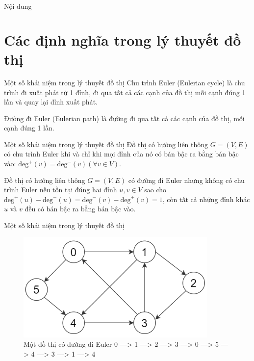 \documentclass[10pt]{beamer}
\theoremstyle{remark}
\numberwithin{algocf}{section}
\numberwithin{equation}{section}
\numberwithin{dl}{section}
\numberwithin{figure}{section}
\begin{document}
\begin{frame}[plain]{Nội dung}
    \tableofcontents[hidesubsections]
\end{frame}

\section{Các định nghĩa trong lý thuyết đồ thị}

\begin{frame}{Một số khái niệm trong lý thuyết đồ thị}
    Chu trình Euler (Eulerian cycle) là chu trình đi xuất phát từ 1 đỉnh, đi qua tất cả các cạnh của đồ thị mỗi cạnh đúng 1 lần và quay lại đỉnh xuất phát.

    Đường đi Euler (Eulerian path) là đường đi qua tất cả các cạnh của đồ thị, mỗi cạnh đúng 1 lần.

\end{frame}
\begin{frame}{Một số khái niệm trong lý thuyết đồ thị}
    Đồ thị có hướng liên thông $G=(V,E)$ có chu trình Euler khi và chỉ khi mọi đỉnh của nó có bán bậc ra bằng bán bậc vào: $\mathrm{deg}^{+}(v)=\mathrm{deg}^{-}(v) (\forall v \in V)$.

    Đồ thị có hướng liên thông $G=(V,E)$ có đường đi Euler nhưng không có chu trình Euler nếu tồn tại đúng hai đỉnh $u, v \in V$ sao cho $\mathrm{deg}^{+}(u) - \mathrm{deg}^{-}(u)=\mathrm{deg}^{-}(v) - \mathrm{deg}^{+}(v)=1$,
    còn tất cả những đỉnh khác $u$ và $v$ đều có bán bậc ra bằng bán bậc vào.
\end{frame}

\begin{frame}{Một số khái niệm trong lý thuyết đồ thị}
    \begin{figure}[h!]
        \centering
        \includegraphics[height=0.6\textheight]{figures/eulerian_path_example.png}
        \caption{Một đồ thị có đường đi Euler 0 —> 1 —> 2 —> 3 —> 0 —> 5 —> 4 —> 3 —> 1 —> 4}
    \end{figure}
\end{frame}
\end{document}

